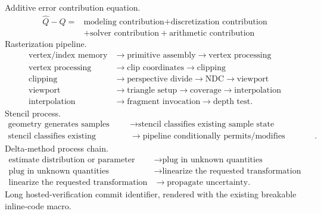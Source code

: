 \documentclass[11pt,twoside,openany]{book}
\begin{document}
\clearpage
\noindent Additive error contribution equation.
\[\boxed{\begin{aligned}\hat Q-Q ={}&\text{modeling contribution} + \text{discretization contribution}\\&+\text{solver contribution} + \text{arithmetic contribution}\end{aligned}}\]
\clearpage
\noindent Rasterization pipeline.
\[\begin{aligned}\text{vertex/index memory} &\rightarrow \text{primitive assembly} \rightarrow \text{vertex processing}\\\text{vertex processing} &\rightarrow \text{clip coordinates} \rightarrow \text{clipping}\\\text{clipping} &\rightarrow \text{perspective divide} \rightarrow \text{NDC} \rightarrow \text{viewport}\\\text{viewport} &\rightarrow \text{triangle setup} \rightarrow \text{coverage} \rightarrow \text{interpolation}\\\text{interpolation} &\rightarrow \text{fragment invocation} \rightarrow \text{depth test}.\end{aligned}\]
\clearpage
\noindent Stencil process.
\[\begin{aligned}\text{geometry generates samples} &\rightarrow \text{stencil classifies existing sample state}\\\text{stencil classifies existing sample state} &\rightarrow \text{pipeline conditionally permits/modifies fragments}.\end{aligned}\]
\clearpage
\noindent Delta-method process chain.
\[\begin{aligned}\text{estimate distribution or parameter} &\rightarrow \text{plug in unknown quantities}\\\text{plug in unknown quantities} &\rightarrow \text{linearize the requested transformation}\\\text{linearize the requested transformation} &\rightarrow \text{propagate uncertainty}.\end{aligned}\]
\clearpage
\noindent Long hosted-verification commit identifier, rendered with the existing breakable inline-code macro.
\end{document}
